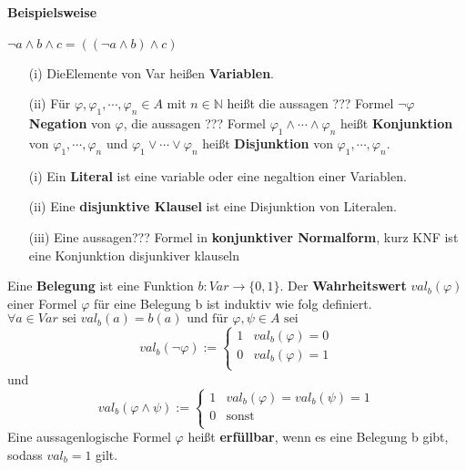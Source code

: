     \paragraph*{Beispielsweise}
        \(\lnot a \wedge b \wedge c = ((\lnot a \wedge b)\wedge c)\)
    
    \begin{itemize}
        \item [(i)]DieElemente von Var heißen \textbf{Variablen}.
        \item [(ii)] Für \(\varphi, \varphi_1, \cdots, \varphi_n \in A\) mit \(n \in \mathbb{N}\) heißt die aussagen ??? Formel \( \lnot \varphi\) \textbf{Negation} von \(\varphi\), die aussagen ??? Formel \(\varphi_1 \wedge \cdots \wedge \varphi_n\) heißt \textbf{Konjunktion} von \(\varphi_1, \cdots, \varphi_n\) und \(\varphi_1 \vee \cdots \vee \varphi_n\) heißt \textbf{Disjunktion} von \(\varphi_1, \cdots, \varphi_n\).
    \end{itemize}

\begin{itemize}
    \item [(i)] Ein \textbf{Literal} ist eine variable oder eine negaltion einer Variablen.
    \item [(ii)] Eine \textbf{disjunktive Klausel} ist eine Disjunktion von Literalen.
    \item [(iii)] Eine aussagen??? Formel in \textbf{konjunktiver Normalform}, kurz KNF ist eine Konjunktion disjunkiver klauseln
\end{itemize}

    Eine \textbf{Belegung} ist eine Funktion \(b : Var \to \{0,1\}\). Der \textbf{Wahrheitswert} \(val_b(\varphi)\) einer Formel \(\varphi\) für eine Belegung b ist induktiv wie folg definiert. 
    \vspace*{0.5cm}
    \\
    \(
        \forall a \in Var \text{ sei } val_b(a) = b(a) \text{ und für } \varphi, \psi \in A \text{ sei} 
    \)
    \begin{equation}
        val_b(\lnot \varphi) := 
        \begin{cases}
            1 & val_b(\varphi) = 0\\
            0 & val_b(\varphi) = 1\\
        \end{cases}    
    \end{equation}
    und 
    \begin{equation}
        val_b(\varphi \wedge \psi) := 
        \begin{cases}
            1 & val_b(\varphi) = val_b(\psi) = 1\\
            0 & \text{sonst}\\
        \end{cases}    
    \end{equation}
    Eine aussagenlogische Formel \(\varphi\) heißt \textbf{erfüllbar}, wenn es eine Belegung b gibt, sodass \(val_b = 1\) gilt.

